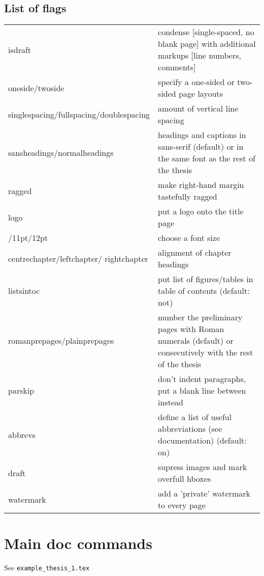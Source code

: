 \subsection{List of flags}

\begin{center}
	\begin{longtable}{>{\ttfamily} p{6cm} | >{\small}p{7cm}}
		isdraft									& condense [single-spaced, no blank page] with additional markups [line numbers, comments]\\[12pt]
		oneside/twoside							& specify a one-sided or two-sided page layouts\\[12pt]
		singlespacing/fullspacing/\hfill doublespacing	& amount of vertical line spacing\\[12pt]
		sansheadings/normalheadings				& headings and captions in sans-serif (default) or in the same font as the rest of the thesis\\[12pt]	
		ragged									& make right-hand margin tastefully ragged\\[12pt]
		logo									& put a logo onto the title page\\[12pt]
		10pt/11pt/12pt							& choose a font size\\[12pt]
		centrechapter/leftchapter/ rightchapter	& alignment of chapter headings\\[12pt]
		listsintoc								& put list of figures/tables in table of contents (default: not)\\[12pt]
		romanprepages/plainprepages				& number the preliminary pages with Roman numerals (default) or consecutively with the rest of the thesis\\[12pt]
		parskip									& don't indent paragraphs, put a blank line between instead\\[12pt]
		abbrevs									& define a list of useful abbreviations (see documentation) (default: on)\\[12pt]
		draft									& supress images and mark overfull hboxes\\[12pt]
		watermark								& add a 'private' watermark to every page\\[12pt]							
	\end{longtable}
\end{center}							


\section{Main doc commands}
See \verb|example_thesis_1.tex|


